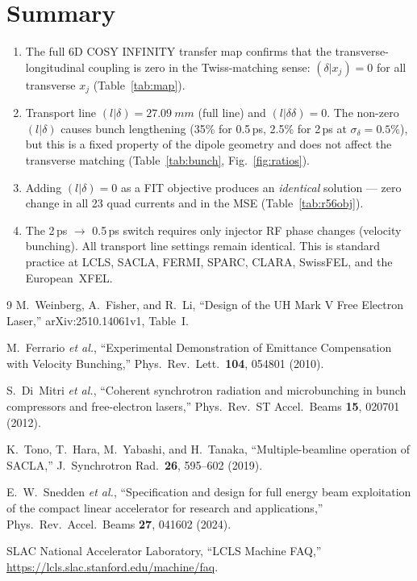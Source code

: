 \documentclass[11pt]{article}
\begin{document}
\section{Summary}

\begin{enumerate}
  \item The full 6D COSY INFINITY transfer map confirms that the
    transverse-longitudinal coupling is zero in the Twiss-matching sense:
    $(\delta|x_j) = 0$ for all transverse $x_j$ (Table~\ref{tab:map}).
  \item Transport line $(l|\delta) = \SI{27.09}{mm}$ (full line) and
    $(l|\delta\delta) = 0$.  The non-zero $(l|\delta)$ causes bunch
    lengthening (35\% for 0.5\,ps, 2.5\% for 2\,ps at
    $\sigma_\delta = 0.5\%$), but this is a fixed property of the dipole
    geometry and does not affect the transverse matching
    (Table~\ref{tab:bunch}, Fig.~\ref{fig:ratios}).
  \item Adding $(l|\delta) = 0$ as a FIT objective produces an
    \emph{identical} solution --- zero change in all 23 quad currents
    and in the MSE (Table~\ref{tab:r56obj}).
  \item The 2\,ps $\to$ 0.5\,ps switch requires only injector RF phase
    changes (velocity bunching).  All transport line settings remain
    identical.  This is standard practice at LCLS, SACLA, FERMI, SPARC,
    CLARA, SwissFEL, and the European~XFEL\@.
\end{enumerate}


\begin{thebibliography}{9}
  M.~Weinberg, A.~Fisher, and R.~Li,
  ``Design of the UH Mark V Free Electron Laser,''
  arXiv:2510.14061v1, Table~I.

  M.~Ferrario \textit{et al.},
  ``Experimental Demonstration of Emittance Compensation with
  Velocity Bunching,''
  Phys.\ Rev.\ Lett.\ \textbf{104}, 054801 (2010).

  S.~Di~Mitri \textit{et al.},
  ``Coherent synchrotron radiation and microbunching in bunch
  compressors and free-electron lasers,''
  Phys.\ Rev.\ ST Accel.\ Beams \textbf{15}, 020701 (2012).

  K.~Tono, T.~Hara, M.~Yabashi, and H.~Tanaka,
  ``Multiple-beamline operation of SACLA,''
  J.\ Synchrotron Rad.\ \textbf{26}, 595--602 (2019).

  E.~W.~Snedden \textit{et al.},
  ``Specification and design for full energy beam exploitation of the
  compact linear accelerator for research and applications,''
  Phys.\ Rev.\ Accel.\ Beams \textbf{27}, 041602 (2024).

  SLAC National Accelerator Laboratory,
  ``LCLS Machine FAQ,''
  \url{https://lcls.slac.stanford.edu/machine/faq}.
\end{thebibliography}
\end{document}
